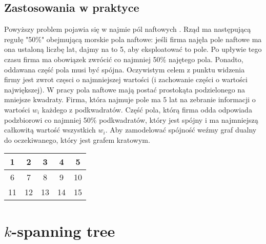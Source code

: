 \documentclass{article}
\begin{document}
\subsection{Zastosowania w praktyce}

Powyższy problem pojawia się w najmie pól naftowych \cite{oil_fields}. Rząd ma następującą regułę "50\%" obejmującą morskie pola naftowe: jeśli firma najęła pole naftowe ma ona ustaloną liczbę lat, dajmy na to 5, aby eksploatować to pole. Po upływie tego czasu firma ma obowiązek zwrócić co najmniej 50\% najętego pola. Ponadto, oddawana część pola musi być spójna. Oczywistym celem z punktu widzenia firmy jest zwrot częsci o najmniejszej wartości (i zachowanie części o wartości największej). W pracy \cite{oil_fields} pola naftowe mają postać prostokąta podzielonego na mniejsze kwadraty. Firma, która najmuje pole ma 5 lat na zebranie informacji o wartości $w_i$ każdego z podkwadratów. Część pola, którą firma odda odpowiada podzbiorowi co najmniej 50\% podkwadratów, który jest spójny i ma najmniejszą całkowitą wartość wszystkich $w_i$. Aby zamodelować spójność weźmy graf dualny do oczekiwanego, który jest grafem kratowym.

\begin{figure}
\end{figure}

\begin{table}
    \centering
    \begin{tabular}{|c|c|c|c|c|}\hline
        1 & 2 & 3 & 4 & 5\\\hline
        6 & 7 & 8 & 9 & 10\\\hline
        11 & 12 & 13 & 14 & 15\\\hline
    \end{tabular}
\end{table}


\section{$k$-spanning tree}

\newpage



\end{document}
